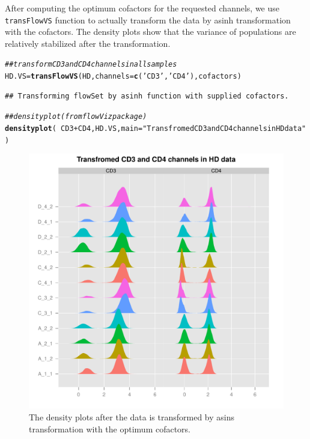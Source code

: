 \documentclass{article}\usepackage[]{graphicx}\usepackage[]{color}
\makeatletter
\def\maxwidth{ %
  \ifdim\Gin@nat@width>\linewidth
    \linewidth
  \else
    \Gin@nat@width
  \fi
}
\newcommand{\hlstr}[1]{\textcolor[rgb]{0.192,0.494,0.8}{#1}}%
\newcommand{\hlcom}[1]{\textcolor[rgb]{0.678,0.584,0.686}{\textit{#1}}}%
\newcommand{\hlopt}[1]{\textcolor[rgb]{0,0,0}{#1}}%
\newcommand{\hlstd}[1]{\textcolor[rgb]{0.345,0.345,0.345}{#1}}%
\newcommand{\hlkwb}[1]{\textcolor[rgb]{0.69,0.353,0.396}{#1}}%
\newcommand{\hlkwc}[1]{\textcolor[rgb]{0.333,0.667,0.333}{#1}}%
\newcommand{\hlkwd}[1]{\textcolor[rgb]{0.737,0.353,0.396}{\textbf{#1}}}%
\newenvironment{kframe}{%
 \def\at@end@of@kframe{}%
 \ifinner\ifhmode%
  \def\at@end@of@kframe{\end{minipage}}%
  \begin{minipage}{\columnwidth}%
 \fi\fi%
 \def\FrameCommand##1{\hskip\@totalleftmargin \hskip-\fboxsep
 \colorbox{shadecolor}{##1}\hskip-\fboxsep
     \hskip-\linewidth \hskip-\@totalleftmargin \hskip\columnwidth}%
 \MakeFramed {\advance\hsize-\width
   \@totalleftmargin\z@ \linewidth\hsize
   \@setminipage}}%
 {\par\unskip\endMakeFramed%
 \at@end@of@kframe}
\newenvironment{knitrout}{}{} %
\makeatother
\begin{document}
After computing the optimum cofactors for the requested channels, we use \texttt{transFlowVS} function to actually transform the data by asinh transformation with the cofactors.
The density plots show that the variance of populations are relatively stabilized after the transformation.
\begin{knitrout}
\color{fgcolor}\begin{kframe}
\begin{alltt}
\hlcom{## transform CD3 and CD4 channels in all samples}
\hlstd{HD.VS} \hlkwb{=} \hlkwd{transFlowVS}\hlstd{(HD,} \hlkwc{channels}\hlstd{=}\hlkwd{c}\hlstd{(}\hlstr{'CD3'}\hlstd{,} \hlstr{'CD4'}\hlstd{), cofactors)}
\end{alltt}
\begin{verbatim}
## Transforming flowSet by asinh function with supplied cofactors.
\end{verbatim}
\begin{alltt}
\hlcom{## density plot (from flowViz package)}
\hlkwd{densityplot}\hlstd{(}\hlopt{~}\hlstd{CD3}\hlopt{+}\hlstd{CD4, HD.VS,} \hlkwc{main}\hlstd{=}\hlstr{"Transfromed CD3 and CD4 channels in HD data"}\hlstd{)}
\end{alltt}
\end{kframe}\begin{figure}
\includegraphics[width=\maxwidth]{figure/densityHD-1} \caption[The density plots after the data is transformed by asins transformation with the optimum cofactors]{The density plots after the data is transformed by asins transformation with the optimum cofactors.}\label{fig:densityHD}
\end{figure}


\end{knitrout}
\end{document}
